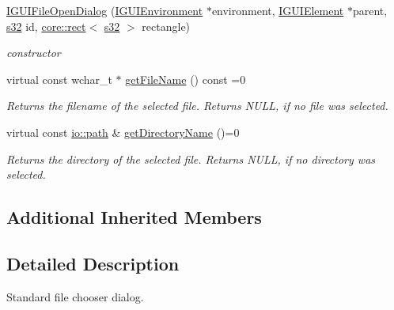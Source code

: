 \begin{DoxyCompactItemize}
\hyperlink{classirr_1_1gui_1_1IGUIFileOpenDialog_a81f9db27e22941dc8370b7b7630501db}{I\+G\+U\+I\+File\+Open\+Dialog} (\hyperlink{classirr_1_1gui_1_1IGUIEnvironment}{I\+G\+U\+I\+Environment} $\ast$environment, \hyperlink{classirr_1_1gui_1_1IGUIElement}{I\+G\+U\+I\+Element} $\ast$parent, \hyperlink{namespaceirr_ac66849b7a6ed16e30ebede579f9b47c6}{s32} id, \hyperlink{classirr_1_1core_1_1rect}{core\+::rect}$<$ \hyperlink{namespaceirr_ac66849b7a6ed16e30ebede579f9b47c6}{s32} $>$ rectangle)
\begin{DoxyCompactList}\small\item\em constructor \end{DoxyCompactList}\item 
\mbox{\label{classirr_1_1gui_1_1IGUIFileOpenDialog_aa51c982b5e8264588473c147cd9a5b7b}} 
virtual const wchar\+\_\+t $\ast$ \hyperlink{classirr_1_1gui_1_1IGUIFileOpenDialog_aa51c982b5e8264588473c147cd9a5b7b}{get\+File\+Name} () const =0
\begin{DoxyCompactList}\small\item\em Returns the filename of the selected file. Returns N\+U\+LL, if no file was selected. \end{DoxyCompactList}\item 
\mbox{\label{classirr_1_1gui_1_1IGUIFileOpenDialog_a2bc36296e0efe14992e88c9a1f4f5c61}} 
virtual const \hyperlink{namespaceirr_1_1io_a6468281622ce3a1c46b72e19f32dded5}{io\+::path} \& \hyperlink{classirr_1_1gui_1_1IGUIFileOpenDialog_a2bc36296e0efe14992e88c9a1f4f5c61}{get\+Directory\+Name} ()=0
\begin{DoxyCompactList}\small\item\em Returns the directory of the selected file. Returns N\+U\+LL, if no directory was selected. \end{DoxyCompactList}\end{DoxyCompactItemize}
\subsection*{Additional Inherited Members}


\subsection{Detailed Description}
Standard file chooser dialog. 

